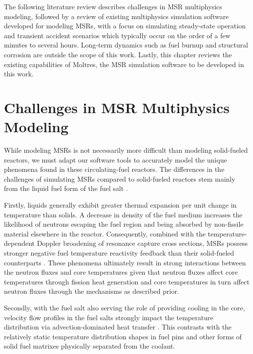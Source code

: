 The following literature review describes challenges in \gls{MSR} multiphysics
modeling, followed by a review of existing multiphysics simulation software
developed for modeling \glspl{MSR}, with a focus on simulating steady-state
operation and transient
accident scenarios which typically occur on the order of a few minutes to
several hours. Long-term dynamics such as fuel burnup and structural corrosion
are outside the scope of this work. Lastly, this chapter reviews the existing
capabilities of Moltres, the MSR simulation software to be developed in this
work.

\section{Challenges in \gls{MSR} Multiphysics Modeling}

While modeling \glspl{MSR} is not necessarily more difficult than modeling
solid-fueled reactors, we must adapt our software tools to accurately model the
unique phenomena found in these circulating-fuel reactors. The differences in
the challenges of simulating \glspl{MSR} compared to solid-fueled reactors stem
mainly from the liquid fuel form of the fuel salt \cite{huff_identifying_2019,
diamond_phenomena_2018}.

Firstly, liquids generally exhibit greater thermal
expansion per unit change in temperature than solids. A decrease in density of
the fuel medium increases the likelihood of neutrons escaping the fuel region
and being absorbed by non-fissile material elsewhere in the reactor.
Consequently, combined with the temperature-dependent Doppler broadening of
resonance capture cross sections, \glspl{MSR} possess stronger negative fuel
temperature reactivity feedback than their solid-fueled counterparts
\cite{elsheikh_safety_2013}. These
phenomena ultimately result in strong interactions between the neutron fluxes
and core temperatures given that neutron fluxes affect core temperatures
through fission heat generation and core temperatures in turn affect neutron
fluxes through the mechanisms as described prior.

Secondly, with the fuel
salt also serving the role of providing cooling in the core, velocity flow
profiles in the fuel salts strongly impact the temperature distribution via
advection-dominated heat transfer \cite{diamond_phenomena_2018}. This contrasts
with the relatively static temperature distribution shapes in fuel pins and
other forms of solid fuel matrixes physically separated from the coolant.


